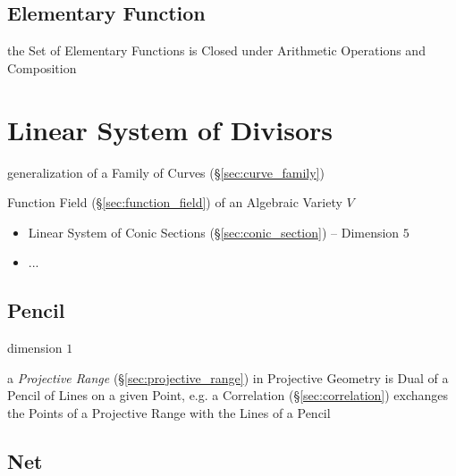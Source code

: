 \subsection{Elementary Function}\label{sec:elementary_function}

the Set of Elementary Functions is Closed under Arithmetic Operations and
Composition



\section{Linear System of Divisors}\label{sec:linear_system_of_divisors}

generalization of a Family of Curves (\S\ref{sec:curve_family})

Function Field (\S\ref{sec:function_field}) of an Algebraic Variety $V$

\begin{itemize}
  \item Linear System of Conic Sections (\S\ref{sec:conic_section}) --
    Dimension $5$
  \item ...
\end{itemize}



\subsection{Pencil}\label{sec:pencil}

dimension $1$

\fist a \emph{Projective Range} (\S\ref{sec:projective_range}) in Projective
Geometry is Dual of a Pencil of Lines on a given Point, e.g. a Correlation
(\S\ref{sec:correlation}) exchanges the Points of a Projective Range with the
Lines of a Pencil



\subsection{Net}\label{sec:linear_divisor_net}

